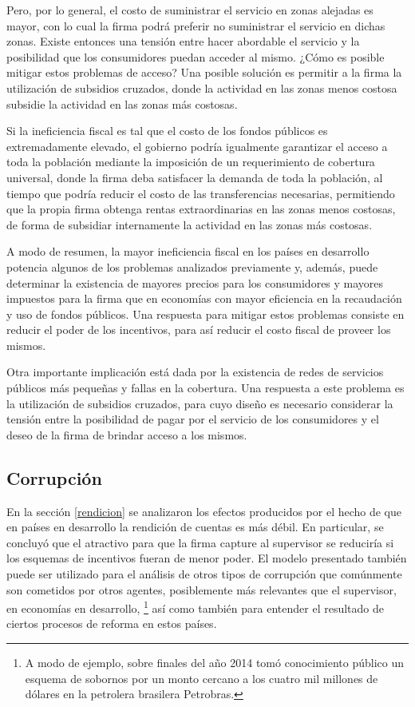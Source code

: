 \documentclass[
  12pt,
  spanish,
]{book}
\begin{document}
Pero, por lo general, el costo de suministrar el servicio en zonas alejadas es mayor, con lo cual la firma podrá preferir no suministrar el servicio en dichas zonas. Existe entonces una tensión entre hacer abordable el servicio y la posibilidad que los consumidores puedan acceder al mismo. ¿Cómo es posible mitigar estos problemas de acceso? Una posible solución es permitir a la firma la utilización de subsidios cruzados, donde la actividad en las zonas menos costosa subsidie la actividad en las zonas más costosas.

Si la ineficiencia fiscal es tal que el costo de los fondos públicos es extremadamente elevado, el gobierno podría igualmente garantizar el acceso a toda la población mediante la imposición de un requerimiento de cobertura universal, donde la firma deba satisfacer la demanda de toda la población, al tiempo que podría reducir el costo de las transferencias necesarias, permitiendo que la propia firma obtenga rentas extraordinarias en las zonas menos costosas, de forma de subsidiar internamente la actividad en las zonas más costosas.

A modo de resumen, la mayor ineficiencia fiscal en los países en desarrollo potencia algunos de los problemas analizados previamente y, además, puede determinar la existencia de mayores precios para los consumidores y mayores impuestos para la firma que en economías con mayor eficiencia en la recaudación y uso de fondos públicos. Una respuesta para mitigar estos problemas consiste en reducir el poder de los incentivos, para así reducir el costo fiscal de proveer los mismos.

Otra importante implicación está dada por la existencia de redes de servicios públicos más pequeñas y fallas en la cobertura. Una respuesta a este problema es la utilización de subsidios cruzados, para cuyo diseño es necesario considerar la tensión entre la posibilidad de pagar por el servicio de los consumidores y el deseo de la firma de brindar acceso a los mismos.

\hypertarget{corrupciuxf3n}{%
\subsection{Corrupción}\label{corrupciuxf3n}}

En la sección \ref{rendicion} se analizaron los efectos producidos por el hecho de que en países en desarrollo la rendición de cuentas es más débil. En particular, se concluyó que el atractivo para que la firma capture al supervisor se reduciría si los esquemas de incentivos fueran de menor poder. El modelo presentado también puede ser utilizado para el análisis de otros tipos de corrupción que comúnmente son cometidos por otros agentes, posiblemente más relevantes que el supervisor, en economías en desarrollo,
\footnote{A modo de ejemplo, sobre finales del año 2014 tomó conocimiento público un esquema de sobornos por un monto cercano a los cuatro mil millones de dólares en la petrolera brasilera Petrobras.}
así como también para entender el resultado de ciertos procesos de reforma en estos países.
\end{document}
